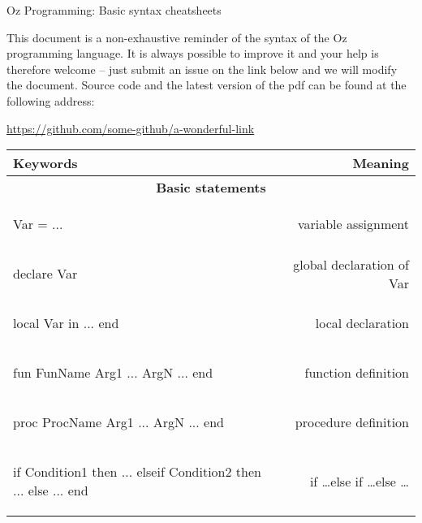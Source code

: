\documentclass[12pt]{article}
\author{Felten Florian}
\begin{document}
\vspace*{2em}
\begin{center} %
	{\Large Oz Programming: Basic syntax cheatsheets}
\end{center}

This document is a non-exhaustive reminder of the syntax of the Oz programming language. It is always possible to improve it and your help is therefore welcome -- just submit an issue on the link below and we will modify the document. Source code and the latest version of the pdf can be found at the following address:
\begin{center}
\url{https://github.com/some-github/a-wonderful-link}
\end{center}

\renewcommand*{\arraystretch}{1.5}
\begin{longtable}{l r}
\toprule[0.2em]
\multicolumn{1}{l}{\textbf{Keywords}} & \textbf{Meaning}\\
\midrule


\multicolumn{2}{c}{\textbf{Basic statements}}\\

\begin{oz}
Var = ...
\end{oz}
&variable assignment\\

\begin{oz}
declare Var 
\end{oz}
&global declaration of Var\\
 
\begin{oz}
local Var in 
  ...
end
\end{oz}
&local declaration\\
 
 
\begin{oz}
fun {FunName Arg1 ... ArgN}
  ...
end
\end{oz}
&function definition\\
 
\begin{oz}
proc {ProcName Arg1 ... ArgN}
  ...
end
\end{oz}
&procedure definition\\

\begin{oz}
if Condition1 then ...
elseif Condition2 then ...
else ...
end
\end{oz}
&if \dots else if \dots else \dots \\
 

\end{longtable}
\end{document}
